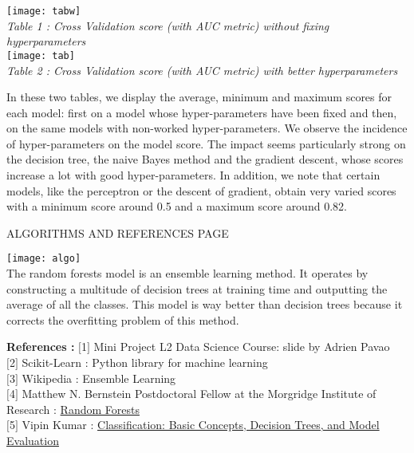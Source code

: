 \documentclass[10pt]{report}
\begin{document}
\bigbreak
\bigbreak
\bigbreak
\bigbreak
\begin{center}
\texttt{[image: tabw]}\\
\emph{Table 1 : Cross Validation score (with AUC metric) without fixing hyperparameters}\\[0.5cm]
\texttt{[image: tab]}\\
\emph{Table 2 : Cross Validation score (with AUC metric) with better hyperparameters}
\end{center}

\bigbreak
\bigbreak

\normalsize
In these two tables, we display the average, minimum and maximum scores for each model: first on a model whose hyper-parameters have been fixed and then, on the same models with non-worked hyper-parameters. We observe the incidence of hyper-parameters on the model score. The impact seems particularly strong on the decision tree, the naive Bayes method and the gradient descent, whose scores increase a lot with good hyper-parameters. In addition, we note that certain models, like the perceptron or the descent of gradient, obtain very varied scores with a minimum score around 0.5 and a maximum score around 0.82.


\clearpage

\begin{center}
\Large ALGORITHMS AND REFERENCES PAGE
\end{center}

\bigbreak
\bigbreak
\bigbreak
\bigbreak

\texttt{[image: algo]}\\[0.5cm]
\normalsize
The random forests model is an ensemble learning method. It operates by constructing a multitude of decision trees at training time and outputting the average of all the classes. This model is way better than decision trees because it corrects the overfitting problem of this method.

\bigbreak
\bigbreak
\bigbreak
\bigbreak

\textbf{References :} \medbreak
\noindent
$[$1$]$ Mini Project \- L2 Data Science Course: slide by Adrien Pavao\\
$[$2$]$ Scikit-Learn : Python library for machine learning\\
$[$3$]$ Wikipedia : Ensemble Learning\\
$[$4$]$ Matthew N. Bernstein Postdoctoral Fellow at the Morgridge Institute of Research : \href{http://pages.cs.wisc.edu/~matthewb/pages/notes/pdf/ensembles/RandomForests.pdf}{Random Forests}\\
$[$5$]$ Vipin Kumar : \href{https://www-users.cs.umn.edu/~kumar001/dmbook/ch4.pdf}{Classification: Basic Concepts, Decision Trees, and Model Evaluation}
\end{document}
